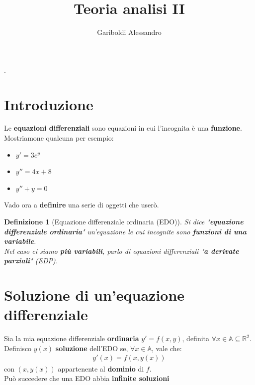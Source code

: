 \documentclass[a4paper, oneside]{article}
\title{Teoria analisi II}
\author{Gariboldi Alessandro}
\date{ }
\newcommand\R{\mathbb{R}}
\newcommand\A{\mathbb{A}}
\begin{document}
                {}          %
                {}          %
                {\slshape}  %
                {}          %
                {\bfseries} %
                {.}         %
                {\newline}         %
                {}          %
\theoremstyle{theoremEnv}

\newtheorem{definition}{Definizione}[section]
\newtheorem{theorem}{Teorema}[section]
\newtheorem{lemma}{Lemma}[section]
\newtheorem{observation}{Oss.}[section]
\newtheorem{corollary}{Corollario}[theorem]
\newtheorem{example}{Esempio}[section]
\newtheorem{problem}{Problema}[section]
\newtheorem{solution}{Soluzione}[section]
\newtheorem{proposition}{Proposizione}[section]
\newtheorem{aside}{Inciso}[section]

\maketitle

\tableofcontents

\newpage

\section{Introduzione}
    Le \textbf{equazioni differenziali} sono equazioni in cui l'incognita è una \textbf{funzione}. Mostriamone qualcuna per esempio:
    \begin{itemize}
        \item $y'=3 e^y$
        \item $y''=4x+8$
        \item $y''+y=0$
    \end{itemize}
    Vado ora a \textbf{definire} una serie di oggetti che userò.

    \begin{definition}[Equazione differenziale ordinaria (EDO)]
        Si dice "\textbf{equazione differenziale ordinaria}" un'equazione le cui incognite sono \textbf{funzioni di una variabile}. \\
        Nel caso ci siamo \textbf{più variabili}, parlo di equazioni differenziali "\textbf{a derivate parziali}" (EDP). 
    \end{definition}

    \section{Soluzione di un'equazione differenziale}
    Sia la mia equazione differenziale \textbf{ordinaria} $y'=f(x,y)$, definita $\forall x\in \A \subseteq \R^2$.\\
    Definisco $y(x)$ \textbf{soluzione} dell'EDO se, $\forall x\in \A$, vale che:
    \begin{gather*}
        y'(x) = f\left(x,y(x)\right)
    \end{gather*}
    con $\left(x,y(x)\right)$ appartenente al \textbf{dominio} di $f$.\\
    Può succedere che una EDO abbia \textbf{infinite soluzioni}
\end{document}
